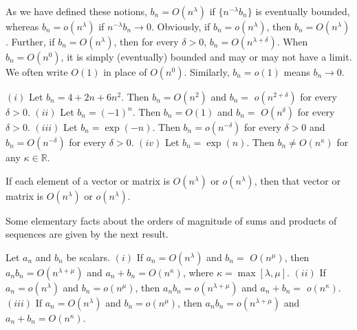 As we have defined these notions, $b_n = O(n^{\lambda})$ if $\{n^{-\lambda}b_n\}$ is eventually
bounded, whereas $b_n = o(n^{\lambda})$ if $n^{-\lambda}b_n \to 0$. Obviously, if $b_n = o(n^{\lambda})$, then
$b_n = O(n^{\lambda})$. Further, if $b_n = O(n^{\lambda})$, then for every $\delta > 0$, $b_n = O(n^{\lambda+\delta})$.
When $b_n = O(n^0)$, it is simply (eventually) bounded and may or may not
have a limit. We often write $O(1)$ in place of $O(n^0)$. Similarly, $b_n = o(1)$
means $b_n \to 0$.

\begin{example}\label{ex:bigO}
$(i)$ Let $b_n = 4 + 2n + 6n^2$. Then $b_n = O(n^2)$ and $b_n =$
$o(n^{2+\delta})$ for every $\delta > 0$. $(ii)$ Let $b_n = (-1)^n$. Then $b_n = O(1)$ and $b_n =$
$O(n^{\delta})$ for every $\delta > 0$. $(iii)$ Let $b_n = \exp(-n)$. Then $b_n = o(n^{-\delta})$ for
every $\delta > 0$ and $b_n = O(n^{-\delta})$ for every $\delta > 0$. $(iv)$ Let $b_n = \exp(n)$. Then
$b_n \neq O(n^{\kappa})$ for any $\kappa \in \mathbb{R}$.
\end{example}

If each element of a vector or matrix is $O(n^{\lambda})$ or $o(n^{\lambda})$, then that vector
or matrix is $O(n^{\lambda})$ or $o(n^{\lambda})$.

Some elementary facts about the orders of magnitude of sums and products of sequences are given by the next result.

\begin{proposition}\label{prop:bigO-algebra}
Let $a_n$ and $b_n$ be scalars. $(i)$ If $a_n = O(n^{\lambda})$ and $b_n =$
$O(n^{\mu})$, then $a_nb_n = O(n^{\lambda+\mu})$ and $a_n + b_n = O(n^{\kappa})$, where $\kappa = \max[\lambda, \mu]$.
$(ii)$ If $a_n = o(n^{\lambda})$ and $b_n = o(n^{\mu})$, then $a_nb_n = o(n^{\lambda+\mu})$ and $a_n + b_n =$
$o(n^{\kappa})$. $(iii)$ If $a_n = O(n^{\lambda})$ and $b_n = o(n^{\mu})$, then $a_nb_n = o(n^{\lambda+\mu})$ and
$a_n + b_n = O(n^{\kappa})$.
\end{proposition}

